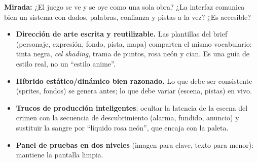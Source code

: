 \documentclass[11pt,a4paper]{article}
\begin{document}
\begin{perfil}
\textbf{Mirada:} ¿El juego se ve y se oye como una sola obra? ¿La interfaz comunica bien un sistema
con dados, palabras, confianza y pistas a la vez? ¿Es accesible?
\end{perfil}

\begin{fuerte}
\begin{itemize}
\item \textbf{Dirección de arte escrita y reutilizable.} Las plantillas del brief (personaje,
expresión, fondo, pista, mapa) comparten el mismo vocabulario: tinta negra, \emph{cel shading},
trama de puntos, rosa neón y cian. Es una guía de estilo real, no un ``estilo anime''.
\item \textbf{Híbrido estático/dinámico bien razonado.} Lo que debe ser consistente (sprites,
fondos) se genera antes; lo que debe variar (escena, pistas) en vivo.
\item \textbf{Trucos de producción inteligentes}: ocultar la latencia de la escena del crimen con la
secuencia de descubrimiento (alarma, fundido, anuncio) y sustituir la sangre por ``líquido rosa
neón'', que encaja con la paleta.
\item \textbf{Panel de pruebas en dos niveles} (imagen para clave, texto para menor): mantiene la
pantalla limpia.
\end{itemize}
\end{fuerte}
\end{document}
